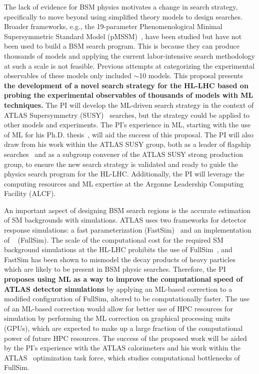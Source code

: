 \documentclass[letter, USenglish, 11pt, subfigure]{article}
\begin{document}
The lack of evidence for BSM physics motivates a change in search strategy, specifically to move beyond using simplified theory models to design searches. Broader frameworks, e.g., the 19-parameter Phenomenological 
Minimal Supersymmetric Standard Model (pMSSM)~\cite{Djouadi_2007,Berger:2008cq,Cahill_Rowley_2012}, have been studied but have not been used to build a BSM search program. This is because they can produce thousands of models and applying the current labor-intensive search methodology at such a scale is not feasible. Previous attempts at categorizing the experimental observables of these models only included $\sim$10 models. This proposal presents {\bf the development of a novel search strategy for the HL-LHC based on probing the experimental observables of thousands of models with ML techniques.} The PI will develop the ML-driven search strategy in the context of ATLAS Supersymmetry (SUSY)~\cite{Golfand:1971iw,Volkov:1973ix,Wess:1974tw,Wess:1974jb,Ferrara:1974pu,Salam:1974ig} searches, but the strategy could be applied to other models and experiments. The PI's experience in ML, starting with the use of ML for his Ph.D. thesis~\cite{Aaltonen:2011fi,Aaltonen:2013as}, will aid the success of this proposal. The PI will also draw from his work within the ATLAS SUSY group, both as a leader of flagship searches~\cite{stop0L_1,stopRun1,stop0L_2,stop0L_3} and as a subgroup convener of the ATLAS SUSY strong production group, to ensure the new search strategy is validated and ready to guide the physics search program for the HL-LHC. Additionally, the PI will leverage the computing resources and ML expertise at the Argonne Leadership Computing Facility (ALCF).

An important aspect of designing BSM search regions is the accurate estimation of SM backgrounds with simulations. ATLAS uses two frameworks for detector response simulations: a fast parameterization (FastSim)~\cite{ATL-SOFT-PUB-2018-002} and an implementation of \GEANT~\cite{Agostinelli:2002hh} (FullSim). The scale of the computational cost for the required SM background simulations at the HL-LHC prohibits the use of FullSim~\cite{computingCDR}, and FastSim has been shown to mismodel the decay products of heavy particles~\cite{hcw2018} which are likely to be present in BSM physic searches. Therefore, the PI {\bf proposes using ML as a way to improve the computational speed of ATLAS detector simulations} by applying an ML-based correction to a modified configuration of FullSim, altered to be computationally faster. The use of an ML-based correction would allow for better use of HPC resources for simulation by performing the ML correction on graphical processing units (GPUs), which are expected to make up a large fraction of the computational power of future HPC resources. The success of the proposed work will be aided by the PI's experience with the ATLAS calorimeters and his work within the ATLAS \GEANT\ optimization task force, which studies computational bottlenecks of FullSim. 
\end{document}
